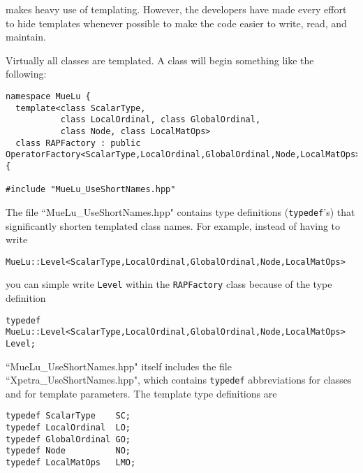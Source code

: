 \muelu makes heavy use of templating.  However, the developers have made every effort to hide templates
whenever possible to make the code easier to write, read, and maintain.

Virtually all \muelu classes are templated.  A class will begin something like the following:

\begin{verbatim}
namespace MueLu {
  template<class ScalarType,
           class LocalOrdinal, class GlobalOrdinal,
           class Node, class LocalMatOps>
  class RAPFactory : public OperatorFactory<ScalarType,LocalOrdinal,GlobalOrdinal,Node,LocalMatOps> {

#include "MueLu_UseShortNames.hpp"
\end{verbatim}
%
The file ``MueLu\_UseShortNames.hpp" contains type definitions (\verb!typedef!'s) that significantly shorten
templated class names.  For example, instead of having to write
\begin{verbatim}
MueLu::Level<ScalarType,LocalOrdinal,GlobalOrdinal,Node,LocalMatOps>
\end{verbatim}
you can simple write \verb!Level!  within the \verb!RAPFactory! class because of the type definition
\begin{verbatim}
typedef MueLu::Level<ScalarType,LocalOrdinal,GlobalOrdinal,Node,LocalMatOps> Level;
\end{verbatim}
``MueLu\_UseShortNames.hpp" itself includes the file ``Xpetra\_UseShortNames.hpp", which contains
\verb!typedef! abbreviations for \xpetra classes and for template parameters.  The template
type definitions are
%
\begin{verbatim}
typedef ScalarType    SC;
typedef LocalOrdinal  LO;
typedef GlobalOrdinal GO;
typedef Node          NO;
typedef LocalMatOps   LMO;
\end{verbatim}
